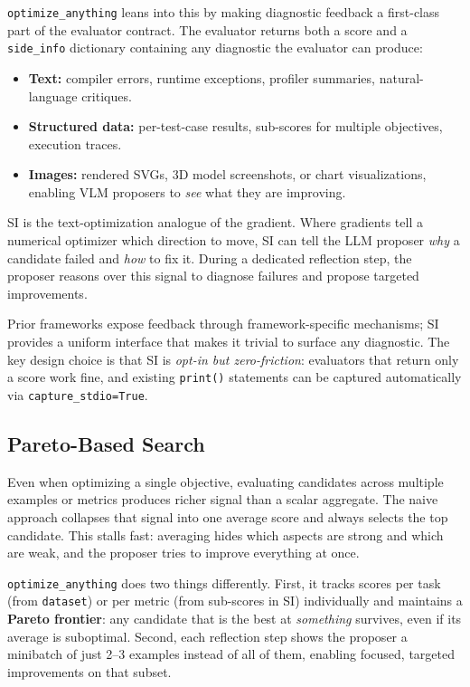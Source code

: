 \documentclass[sigconf]{acmart}
\newcommand{\oa}{\texttt{optimize\_anything}}
\newcommand{\asi}{SI}
\begin{document}
\oa{} leans into this by making diagnostic feedback a first-class part of the evaluator contract. The evaluator returns both a score and a \texttt{side\_info} dictionary containing any diagnostic the evaluator can produce:

\begin{itemize}[leftmargin=*,itemsep=1pt]
  \item \textbf{Text:} compiler errors, runtime exceptions, profiler summaries, natural-language critiques.
  \item \textbf{Structured data:} per-test-case results, sub-scores for multiple objectives, execution traces.
  \item \textbf{Images:} rendered SVGs, 3D model screenshots, or chart visualizations, enabling VLM proposers to \emph{see} what they are improving.
\end{itemize}

\asi{} is the text-optimization analogue of the gradient. Where gradients tell a numerical optimizer which direction to move, \asi{} can tell the LLM proposer \emph{why} a candidate failed and \emph{how} to fix it. During a dedicated reflection step, the proposer reasons over this signal to diagnose failures and propose targeted improvements.

Prior frameworks expose feedback through framework-specific mechanisms; \asi{} provides a uniform interface that makes it trivial to surface any diagnostic. The key design choice is that \asi{} is \emph{opt-in but zero-friction}: evaluators that return only a score work fine, and existing \texttt{print()} statements can be captured automatically via \texttt{capture\_stdio=True}.

\subsection{Pareto-Based Search}\label{sec:pareto}

Even when optimizing a single objective, evaluating candidates across multiple examples or metrics produces richer signal than a scalar aggregate. The naive approach collapses that signal into one average score and always selects the top candidate. This stalls fast: averaging hides which aspects are strong and which are weak, and the proposer tries to improve everything at once.

\oa{} does two things differently. First, it tracks scores per task (from \texttt{dataset}) or per metric (from sub-scores in \asi{}) individually and maintains a \textbf{Pareto frontier}: any candidate that is the best at \emph{something} survives, even if its average is suboptimal. Second, each reflection step shows the proposer a minibatch of just 2--3 examples instead of all of them, enabling focused, targeted improvements on that subset.
\end{document}
